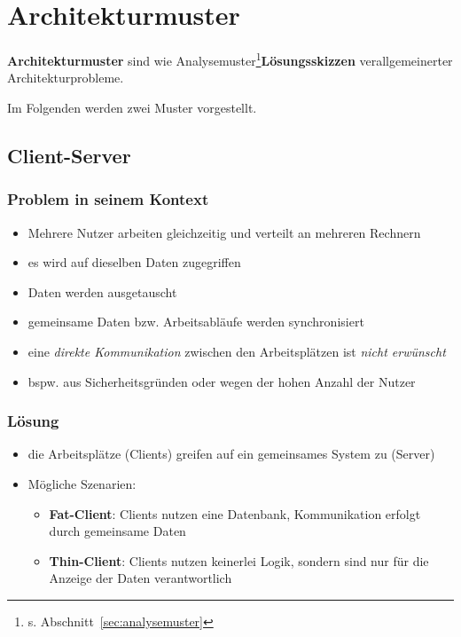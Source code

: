 \section{Architekturmuster}\label{sec:architekturmuster}

\textbf{Architekturmuster} sind wie Analysemuster\footnote{
    s. Abschnitt~\ref{sec:analysemuster}
}\textbf{Lösungsskizzen} verallgemeinerter Architekturprobleme.

Im Folgenden werden zwei Muster vorgestellt.

\subsection{Client-Server}

\subsubsection*{Problem in seinem Kontext}
\begin{itemize}
    \item Mehrere Nutzer arbeiten gleichzeitig und verteilt an mehreren Rechnern
    \item es wird auf dieselben Daten zugegriffen
    \item Daten werden ausgetauscht
    \item gemeinsame Daten bzw. Arbeitsabläufe werden synchronisiert
    \item eine \textit{direkte Kommunikation} zwischen den Arbeitsplätzen ist \textit{nicht erwünscht}
    \item[] bspw. aus Sicherheitsgründen oder wegen der hohen Anzahl der Nutzer
\end{itemize}


\subsubsection*{Lösung}

\begin{itemize}
    \item die Arbeitsplätze (Clients) greifen auf ein gemeinsames System zu (Server)
    \item Mögliche Szenarien:
        \begin{itemize}
            \item \textbf{Fat-Client}: Clients nutzen eine Datenbank, Kommunikation erfolgt durch gemeinsame Daten
            \item \textbf{Thin-Client}: Clients nutzen keinerlei Logik, sondern sind nur für die Anzeige der Daten verantwortlich
        \end{itemize}
\end{itemize}

